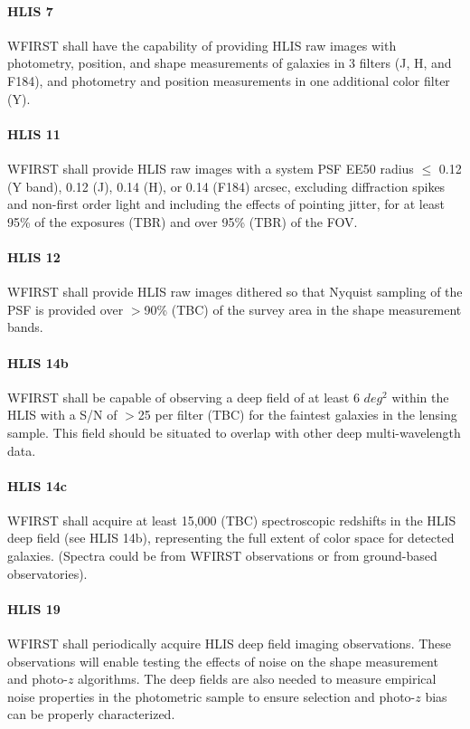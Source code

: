 \paragraph{HLIS 7} WFIRST shall have the capability of providing HLIS raw images with
photometry, position, and shape measurements of galaxies in 3 filters (J, H, and
F184), and photometry and position measurements in one additional color filter
(Y).

\paragraph{HLIS 11} WFIRST shall provide HLIS raw images with a system PSF EE50
radius $\leq$ 0.12 (Y band), 0.12 (J), 0.14 (H), or 0.14 (F184) arcsec, excluding
diffraction spikes and non-first order light and including the effects of
pointing jitter, for at least 95\% of the exposures (TBR) and over 95\% (TBR) of
the FOV.

\paragraph{HLIS 12} WFIRST shall provide HLIS raw images dithered so that
Nyquist sampling of the PSF is provided over $>$90\% (TBC) of the survey area in
the shape measurement bands.

\paragraph{HLIS 14b} WFIRST shall be capable of observing a deep field of at least 6 $deg^2$
within the HLIS with a S/N of $>$25 per filter (TBC) for the faintest galaxies in
the lensing sample. This field should be situated to overlap with other deep
multi-wavelength data.

\paragraph{HLIS 14c} WFIRST shall acquire at least 15,000 (TBC) spectroscopic redshifts in
the HLIS deep field (see HLIS 14b), representing the full extent of color space
for detected galaxies. (Spectra could be from WFIRST observations or from
ground-based observatories).

\paragraph{HLIS 19} WFIRST shall periodically acquire HLIS deep field imaging observations.
These observations will enable testing the effects of noise on the shape
measurement and photo-$z$ algorithms. The deep fields are also needed to measure
empirical noise properties in the photometric sample to ensure selection and
photo-$z$ bias can be properly characterized.

